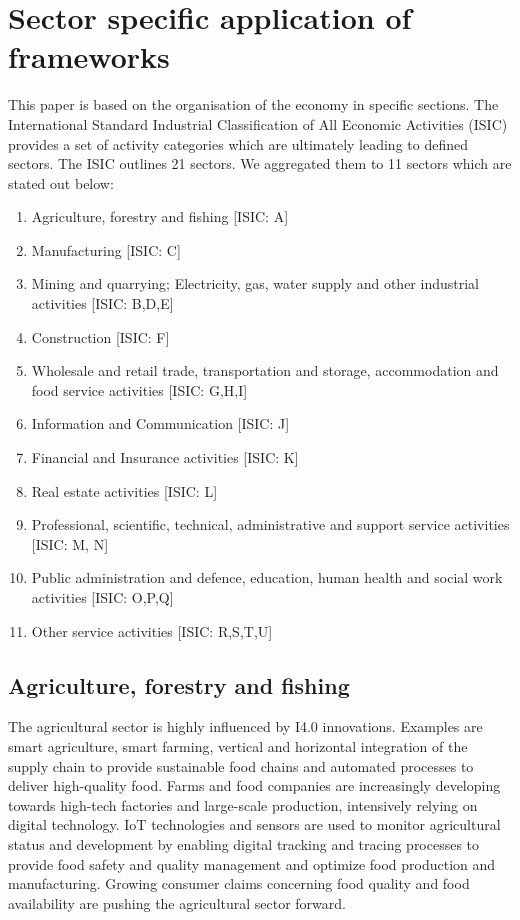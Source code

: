\section{Sector specific application of frameworks}

This paper is based on the organisation of the economy in specific sections. The International Standard Industrial Classification of All Economic Activities (\ac{ISIC}) provides a set of activity categories which are ultimately leading to defined sectors. The \ac{ISIC} outlines 21 sectors. We aggregated them to 11 sectors which are stated out below:

\begin{enumerate}
\item Agriculture, forestry and fishing [ISIC: A]
\item Manufacturing [ISIC: C]
\item Mining and quarrying; Electricity, gas, water supply and other industrial activities [ISIC: B,D,E]
\item Construction [ISIC: F]
\item Wholesale and retail trade, transportation and storage, accommodation and food service activities [ISIC: G,H,I]
\item Information and Communication [ISIC: J]
\item Financial and Insurance activities [ISIC: K]
\item Real estate activities [ISIC: L]
\item Professional, scientific, technical, administrative and support service activities [ISIC: M, N]
\item Public administration and defence, education, human health and social work activities [ISIC: O,P,Q]
\item Other service activities [ISIC: R,S,T,U]
\end{enumerate}

\subsection{Agriculture, forestry and fishing}

The agricultural sector is highly influenced by \ac{I4.0} innovations. Examples are smart agriculture, smart farming, vertical and horizontal integration of the supply chain to provide sustainable food chains and automated processes to deliver high-quality food. Farms and food companies are increasingly developing towards high-tech factories and large-scale production, intensively relying on digital technology. \cite[p.129-151]{FoodAndFarm2020} \ac{IoT} technologies and sensors are used to monitor agricultural status and development by enabling digital tracking and tracing processes to provide food safety and quality management and optimize food production and manufacturing. Growing consumer claims concerning food quality and food availability are pushing the agricultural sector forward.

